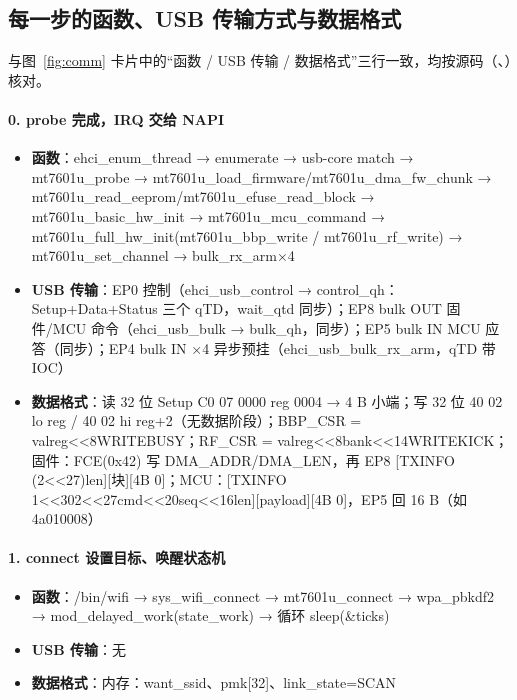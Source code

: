 
\subsection{每一步的函数、USB 传输方式与数据格式}\label{sec:steps-detail}

与图~\ref{fig:comm} 卡片中的“函数 / USB 传输 / 数据格式”三行一致，均按源码（、）核对。

\paragraph*{0. probe 完成，IRQ 交给 NAPI}
\begin{itemize}[leftmargin=2em,itemsep=1pt]
\item \textbf{函数}：ehci\_enum\_thread → enumerate → usb-core match → mt7601u\_probe → mt7601u\_load\_firmware/mt7601u\_dma\_fw\_chunk → mt7601u\_read\_eeprom/mt7601u\_efuse\_read\_block → mt7601u\_basic\_hw\_init → mt7601u\_mcu\_command → mt7601u\_full\_hw\_init(mt7601u\_bbp\_write / mt7601u\_rf\_write) → mt7601u\_set\_channel → bulk\_rx\_arm×4
\item \textbf{USB 传输}：EP0 控制（ehci\_usb\_control → control\_qh：Setup+Data+Status 三个 qTD，wait\_qtd 同步）；EP8 bulk OUT 固件/MCU 命令（ehci\_usb\_bulk → bulk\_qh，同步）；EP5 bulk IN MCU 应答（同步）；EP4 bulk IN ×4 异步预挂（ehci\_usb\_bulk\_rx\_arm，qTD 带 IOC）
\item \textbf{数据格式}：读 32 位 Setup C0 07 0000 reg 0004 → 4 B 小端；写 32 位 40 02 lo reg / 40 02 hi reg+2（无数据阶段）；BBP\_CSR = val\textbar{}reg\textless{}\textless{}8\textbar{}WRITE\textbar{}BUSY；RF\_CSR = val\textbar{}reg\textless{}\textless{}8\textbar{}bank\textless{}\textless{}14\textbar{}WRITE\textbar{}KICK；固件：FCE(0x42) 写 DMA\_ADDR/DMA\_LEN，再 EP8 [TXINFO (2\textless{}\textless{}27)\textbar{}len][块][4B 0]；MCU：[TXINFO 1\textless{}\textless{}30\textbar{}2\textless{}\textless{}27\textbar{}cmd\textless{}\textless{}20\textbar{}seq\textless{}\textless{}16\textbar{}len][payload][4B 0]，EP5 回 16 B（如 4a010008）
\end{itemize}

\paragraph*{1. connect 设置目标、唤醒状态机}
\begin{itemize}[leftmargin=2em,itemsep=1pt]
\item \textbf{函数}：/bin/wifi → sys\_wifi\_connect → mt7601u\_connect → wpa\_pbkdf2 → mod\_delayed\_work(state\_work) → 循环 sleep(\&ticks)
\item \textbf{USB 传输}：无
\item \textbf{数据格式}：内存：want\_ssid、pmk[32]、link\_state=SCAN
\end{itemize}

